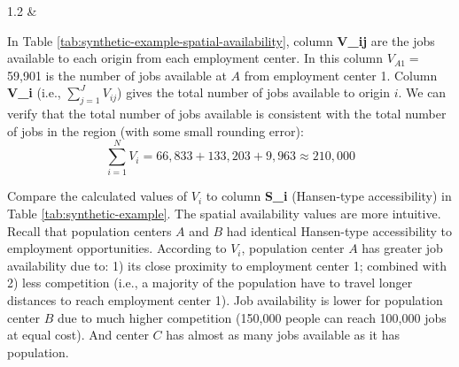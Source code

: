 \documentclass[]{elsarticle} %
\begin{document}
\begin{table}[ht]
\begin{centerbox}
\begin{threeparttable}
\begin{tabularx}{1.2\textwidth}
 &
 \tabularnewline[-0.5pt]


\end{tabularx}
\end{threeparttable}\par\end{centerbox}

\end{table}
 

In Table \ref{tab:synthetic-example-spatial-availability}, column
\textbf{V\_ij} are the jobs available to each origin from each
employment center. In this column \(V_{A1}=\) 59,901 is the number of
jobs available at \(A\) from employment center 1. Column \textbf{V\_i}
(i.e., \(\sum_{j=1}^JV_{ij}\)) gives the total number of jobs available
to origin \(i\). We can verify that the total number of jobs available
is consistent with the total number of jobs in the region (with some
small rounding error): \[
\sum_{i=1}^N V_i = 66,833 + 133,203 + 9,963 \approx 210,000 
\]

Compare the calculated values of \(V_i\) to column \textbf{S\_i}
(Hansen-type accessibility) in Table \ref{tab:synthetic-example}. The
spatial availability values are more intuitive. Recall that population
centers \(A\) and \(B\) had identical Hansen-type accessibility to
employment opportunities. According to \(V_i\), population center \(A\)
has greater job availability due to: 1) its close proximity to
employment center 1; combined with 2) less competition (i.e., a majority
of the population have to travel longer distances to reach employment
center 1). Job availability is lower for population center \(B\) due to
much higher competition (150,000 people can reach 100,000 jobs at equal
cost). And center \(C\) has almost as many jobs available as it has
population.
\end{document}
